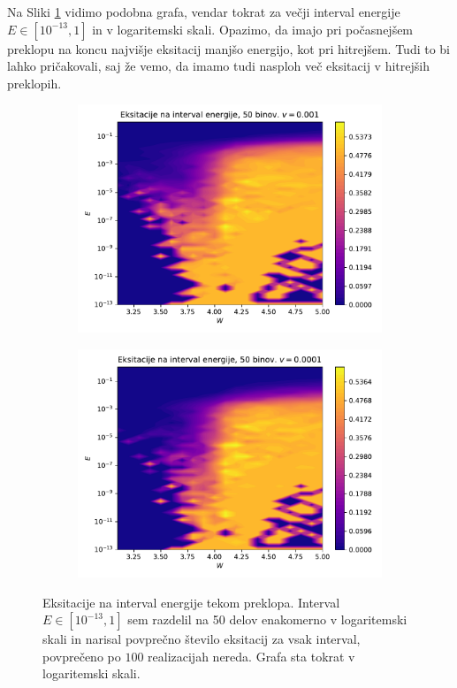 Na Sliki \ref{fig:EksBini2} vidimo podobna grafa, vendar tokrat za večji interval energije $E \in [10^{-13},1]$ in v logaritemski skali. Opazimo, da imajo pri počasnejšem preklopu na koncu najvišje eksitacij manjšo energijo, kot pri hitrejšem. Tudi to bi lahko pričakovali, saj že vemo, da imamo tudi nasploh več eksitacij v hitrejših preklopih.
\begin{figure}[H]
\centering
\begin{subfigure}{.49\textwidth}
\includegraphics[width=\linewidth]{Figures/EksBini3.pdf}
\end{subfigure}
\begin{subfigure}{.49\textwidth}
\includegraphics[width=\linewidth]{Figures/EksBini4.pdf}
\end{subfigure}
\caption{Eksitacije na interval energije tekom preklopa. Interval $E \in [10^{-13},1]$ sem razdelil na 50 delov enakomerno v logaritemski skali in narisal povprečno število eksitacij za vsak interval, povprečeno po $100$ realizacijah nereda. Grafa sta tokrat v logaritemski skali.}
\label{fig:EksBini2}
\end{figure}

